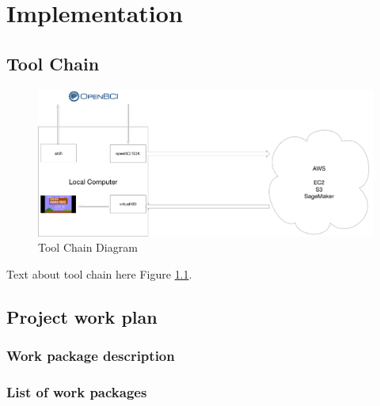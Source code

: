 \chapter{Implementation}
\label{cha:implementation}

\section{Tool Chain}
\label{sec:tc}
\begin{figure}[h!]
  \includegraphics[width=\linewidth]{diagram.jpg}
  \caption{Tool Chain Diagram}
  \label{fig:tcd}
\end{figure}

Text about tool chain here
Figure \ref{fig:tcd}.

\section{Project work plan}
\label{sec:work-plan}

%

\subsection{Work package description}
\label{sec:wps}








\subsection{List of work packages}
\label{sec:wplist}
\makewplist

